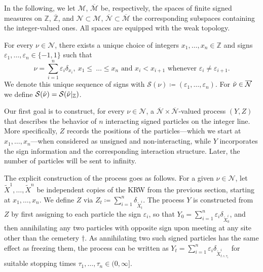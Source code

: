 \documentclass[12pt,reqno,oneside]{amsart}
\numberwithin{equation}{section}
\theoremstyle{definition}
\theoremstyle{remark}
\newcommand{\Z}{\mathbb{Z}}
\newcommand{\OZ}{\overline{\mathbb{Z}}}
\begin{document}
In the following, we let $\mathcal{M}$, $\overline{\mathcal{M}}$ be,
respectively, the spaces of finite signed measures on $\Z$, $\OZ$, and
$\mathcal{N} \subset \mathcal{M}$,
$\overline{\mathcal{N}} \subset \overline{\mathcal{M}}$ the corresponding
subspaces containing the integer-valued ones. All spaces are equipped with
the weak topology.

For every $\nu \in \mathcal{N}$, there exists a unique choice of integers
$x_1, \dots,x_n \in \Z$ and signs
$\varepsilon_1,\dots, \varepsilon_n \in \{-1,1\}$ such that
\begin{equation*}
  \nu=\sum_{i=1}^n \varepsilon_i \delta_{x_i}, \ x_1\leq \ \dots
  \leq x_n \text{ and }  x_i < x_{i+1} \text{ whenever } \varepsilon_i
  \neq \varepsilon_{i+1}.
\end{equation*}
We denote this unique sequence of signs with
$\mathcal{S}(\nu) \coloneq (\varepsilon_1, \ldots, \varepsilon_n)$. For
$\Tilde{\nu} \in \overline{\mathcal{N}}$ we define
$\mathcal{S}(\Tilde{\nu})=\mathcal{S}(\Tilde{\nu}|_\Z)$.

Our first goal is to construct, for every $\nu \in \mathcal{N}$, a
$\overline{\mathcal{N}} \times \overline{\mathcal{N}}$-valued process $(Y,Z)$
that describes the behavior of $n$ interacting signed particles on the
integer line. More specifically, $Z$ records the positions of the
particles---which we start at $x_1,\dots,x_n$---when considered as unsigned
and non-interacting, while $Y$ incorporates the sign information and the
corresponding interaction structure. Later, the number of particles will be
sent to infinity.

The explicit construction of the process goes as follows. For a given
$\nu \in \mathcal{N}$, let $\tilde{X}^1,\dots,\tilde{X}^n$ be independent
copies of the KRW from the previous section, starting at $x_1,\dots,x_n$. We
define $Z$ via $Z_t \coloneq \sum_{i=1}^n \delta_{\tilde{X}_t^i}$. The process $Y$
is constructed from $Z$ by first assigning to each particle the sign
$\varepsilon_i$, so that
$Y_0=\sum_{i=1}^n \varepsilon_i \delta_{\tilde{X}_0^i}$, and then
annihilating any two particles with opposite sign upon meeting at any site
other than the cemetery $\dagger$. As annihilating two such signed particles
has the same effect as freezing them, the process can be written as
$Y_t=\sum_{i=1}^n \varepsilon_i \delta_{\tilde{X}_{t \wedge \tau_i}^i}$ for
suitable stopping times $\tau_1,\dots,\tau_n \in (0,\infty]$.
\end{document}
